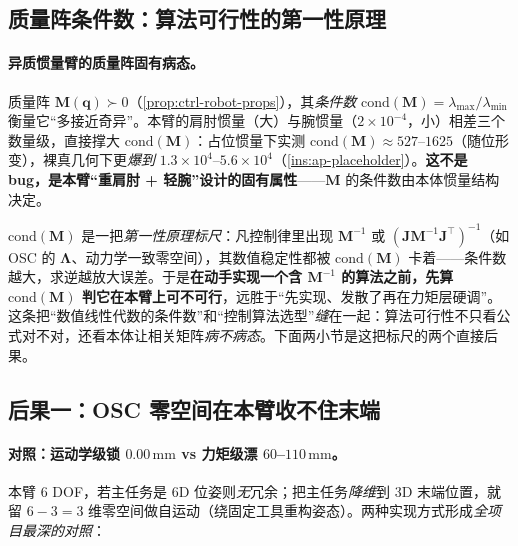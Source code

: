 \subsection{质量阵条件数：算法可行性的第一性原理}
\label{sec:ap-conditioning}

\paragraph{异质惯量臂的质量阵固有病态。}
质量阵 $\mathbf{M}(\mathbf{q})\succ0$（\cref{prop:ctrl-robot-props}），其\emph{条件数} $\mathrm{cond}(\mathbf{M})=\lambda_{\max}/\lambda_{\min}$ 衡量它“多接近奇异”。本臂的肩肘惯量（大）与腕惯量（$2\times10^{-4}$，小）相差三个数量级，直接撑大 $\mathrm{cond}(\mathbf{M})$：占位惯量下实测 $\mathrm{cond}(\mathbf{M})\approx 527$--$1625$（随位形变），裸真几何下更\emph{爆到} $1.3\times10^4$--$5.6\times10^4$（\cref{ins:ap-placeholder}）。\textbf{这不是 bug，是本臂“重肩肘 + 轻腕”设计的固有属性}——$\mathbf{M}$ 的条件数由本体惯量结构决定。

\begin{insight}\label{ins:ap-cond-firstprinciple}
$\mathrm{cond}(\mathbf{M})$ 是一把\emph{第一性原理标尺}：凡控制律里出现 $\mathbf{M}^{-1}$ 或 $(\mathbf{J}\mathbf{M}^{-1}\mathbf{J}^\top)^{-1}$（如 OSC 的 $\boldsymbol{\Lambda}$、动力学一致零空间），其数值稳定性都被 $\mathrm{cond}(\mathbf{M})$ 卡着——条件数越大，求逆越放大误差。于是\textbf{在动手实现一个含 $\mathbf{M}^{-1}$ 的算法之前，先算 $\mathrm{cond}(\mathbf{M})$ 判它在本臂上可不可行}，远胜于“先实现、发散了再在力矩层硬调”。这条把“数值线性代数的条件数”和“控制算法选型”\emph{缝}在一起：算法可行性不只看公式对不对，还看本体让相关矩阵\emph{病不病态}。下面两小节是这把标尺的两个直接后果。
\end{insight}

\subsection{后果一：OSC 零空间在本臂收不住末端}
\label{sec:ap-osc-fail}

\paragraph{对照：运动学级锁 $0.00\,\mathrm{mm}$ vs 力矩级漂 $60$--$110\,\mathrm{mm}$。}
本臂 $6$ DOF，若主任务是 $6$D 位姿则\emph{无}冗余；把主任务\emph{降维}到 $3$D 末端位置，就留 $6-3=3$ 维零空间做自运动（绕固定工具重构姿态）。两种实现方式形成\emph{全项目最深的对照}：

